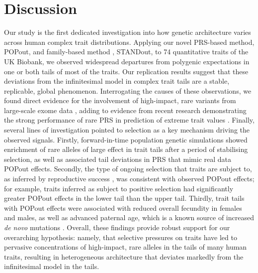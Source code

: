 \documentclass[12pt]{zHenriquesLab-StyleBioRxiv}
\begin{document}
\section*{Discussion} \label{sec:discussion} 
Our study is the first dedicated investigation into how genetic architecture 
varies across human complex trait distributions. Applying our novel 
PRS-based method, POPout, and family-based method \cite{Souaiaia2024}, STANDout, 
to 74 quantitative traits of the UK Biobank, we observed widespread 
departures from polygenic expectations in one or both tails of most of the traits. 
Our replication results suggest that these deviations from the infinitesimal model 
in complex trait tails are a stable, replicable, global phenomenon. Interrogating 
the causes of these observations, we found direct evidence for the involvement of 
high-impact, rare variants from large-scale exome data \cite{Backman2021}, 
adding to evidence from recent research demonstrating the strong performance 
of rare PRS in prediction of extreme trait values \cite{Fiziev2023}. 
Finally, several lines of investigation pointed to selection 
as a key mechanism driving the observed signals. Firstly, forward-in-time population 
genetic simulations \cite{BC_2019} showed enrichment of rare alleles of large effect in trait tails 
after a period of stabilising selection, as well as associated tail deviations
in PRS that mimic real data POPout effects. Secondly, the type of ongoing selection that 
traits are subject to, as inferred by reproductive success \cite{Sanjak2018}, was consistent with 
observed POPout effects; for example, traits inferred as subject to positive selection 
had significantly greater POPout effects in the lower tail than the upper tail. Thirdly, trait 
tails with POPout effects were associated with reduced overall fecundity in 
females and males, as well as advanced paternal age, which is a known source of 
increased \emph{de novo} mutations \cite{Kong2012}. Overall, these findings provide robust support for 
our overarching hypothesis: namely, that selective pressures on traits have led to 
pervasive concentrations of high-impact, rare alleles in the tails of many human traits, 
resulting in heterogeneous architecture that deviates markedly from the infinitesimal model \cite{Barton2017} in the tails.
\end{document}

